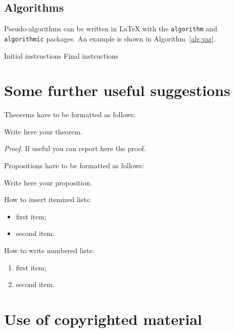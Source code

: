 \documentclass[11pt,a4paper]{article}
\begin{document}
\subsection{Algorithms}
\label{subsec:algorithms}

Pseudo-algorithms can be written in \LaTeX{} with the \texttt{algorithm} and \texttt{algorithmic} packages.
An example is shown in Algorithm~\ref{alg:var}.
\begin{algorithm}[H]
	\label{alg:example}
	\caption{Name of the Algorithm}
	\label{alg:var}
	\label{protocol1}
	\begin{algorithmic}[1]
		\STATE Initial instructions
		\ENDIF
		\ENDFOR
		\ENDWHILE
		\STATE Final instructions
	\end{algorithmic}
\end{algorithm}

\section{Some further useful suggestions}

Theorems have to be formatted as follows:
\begin{theorem}
	\label{a_theorem}
	Write here your theorem.
\end{theorem}
\textit{Proof.} If useful you can report here the proof.
\vspace{0.3cm} %

Propositions have to be formatted as follows:
\begin{proposition}
	Write here your proposition.
\end{proposition}
\vspace{0.3cm} %

How to insert itemized lists:
\begin{itemize}
	\item first item;
	\item second item.
\end{itemize}
How to write numbered lists:
\begin{enumerate}
	\item first item;
	\item second item.
\end{enumerate}

\section{Use of copyrighted material}
\end{document}
